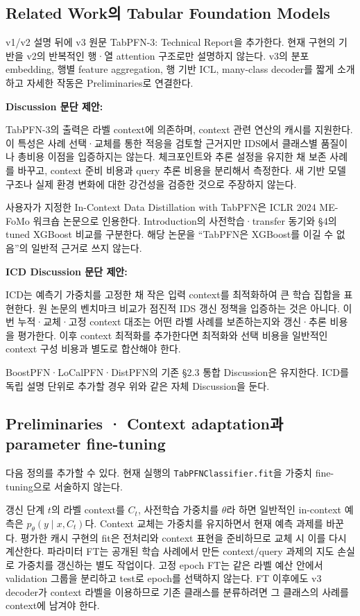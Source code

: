 \subsection{Related Work의 Tabular Foundation Models}
v1/\allowbreak{}v2 설명 뒤에 v3 원문 TabPFN-3: Technical Report을 추가한다. 현재 구현의 기반을 v2의 반복적인 행·열 attention 구조로만 설명하지 않는다. v3의 분포 embedding, 행별 feature aggregation, 행 기반 ICL, many-class decoder를 짧게 소개하고 자세한 작동은 Preliminaries로 연결한다.

\textbf{Discussion 문단 제안:}

TabPFN-3의 출력은 라벨 context에 의존하며, context 관련 연산의 캐시를 지원한다. 이 특성은 사례 선택·교체를 통한 적응을 검토할 근거지만 IDS에서 클래스별 품질이나 총비용 이점을 입증하지는 않는다. 체크포인트와 추론 설정을 유지한 채 보존 사례를 바꾸고, context 준비 비용과 query 추론 비용을 분리해서 측정한다. 새 기반 모델 구조나 실제 환경 변화에 대한 강건성을 검증한 것으로 주장하지 않는다.



사용자가 지정한 In-Context Data Distillation with TabPFN은 ICLR 2024 ME-FoMo 워크숍 논문으로 인용한다. Introduction의 사전학습·transfer 동기와 §4의 tuned XGBoost 비교를 구분한다. 해당 논문을 “TabPFN은 XGBoost를 이길 수 없음”의 일반적 근거로 쓰지 않는다.

\textbf{ICD Discussion 문단 제안:}

ICD는 예측기 가중치를 고정한 채 작은 입력 context를 최적화하여 큰 학습 집합을 표현한다. 원 논문의 벤치마크 비교가 점진적 IDS 갱신 정책을 입증하는 것은 아니다. 이번 누적·교체·고정 context 대조는 어떤 라벨 사례를 보존하는지와 갱신·추론 비용을 평가한다. 이후 context 최적화를 추가한다면 최적화와 선택 비용을 일반적인 context 구성 비용과 별도로 합산해야 한다.



BoostPFN·LoCalPFN·DistPFN의 기존 §2.3 통합 Discussion은 유지한다. ICD를 독립 설명 단위로 추가할 경우 위와 같은 자체 Discussion을 둔다.

\subsection{Preliminaries · Context adaptation과 parameter fine-tuning}
다음 정의를 추가할 수 있다. 현재 실행의 \texttt{TabPFNCl\allowbreak{}assifier\allowbreak{}.\allowbreak{}fit}을 가중치 fine-tuning으로 서술하지 않는다.

갱신 단계 $t$의 라벨 context를 $C_t$, 사전학습 가중치를 $\theta$라 하면 일반적인 in-context 예측은 $p_\theta(y\mid x,C_t)$다. Context 교체는 가중치를 유지하면서 현재 예측 과제를 바꾼다. 평가한 캐시 구현의 fit은 전처리와 context 표현을 준비하므로 교체 시 이를 다시 계산한다. 파라미터 FT는 공개된 학습 사례에서 만든 context/query 과제의 지도 손실로 가중치를 갱신하는 별도 작업이다. 고정 epoch FT는 같은 라벨 예산 안에서 validation 그룹을 분리하고 test로 epoch를 선택하지 않는다. FT 이후에도 v3 decoder가 context 라벨을 이용하므로 기존 클래스를 분류하려면 그 클래스의 사례를 context에 남겨야 한다.



